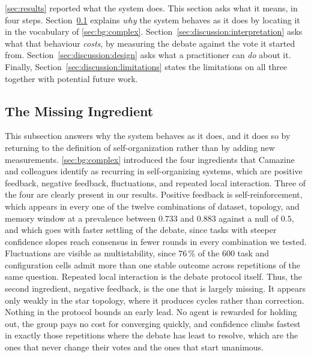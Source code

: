 \autoref{sec:results} reported what the system does. This section asks what it
means, in four steps. Section~\ref{sec:results:synthesis} explains \emph{why} the
system behaves as it does by locating it in the vocabulary of
\autoref{sec:bg:complex}. Section~\ref{sec:discussion:interpretation} asks what
that behaviour \emph{costs}, by measuring the debate against the vote it started
from. Section~\ref{sec:discussion:design} asks what a practitioner can
\emph{do} about it. Finally, Section~\ref{sec:discussion:limitations} states the limitations on
all three together with potential future work.

\subsection{The Missing Ingredient}
\label{sec:results:synthesis}

This subsection answers why the system behaves as it does, and it does so by
returning to the definition of self-organization rather than by adding new
measurements. \autoref{sec:bg:complex} introduced the four ingredients that Camazine and
colleagues identify as recurring in self-organizing systems, which are positive
feedback, negative feedback, fluctuations, and repeated local interaction. Three
of the four are clearly present in our results. Positive feedback is self-reinforcement,
which appears in every one of the twelve combinations of dataset, topology, and
memory window at a prevalence between $0.733$ and $0.883$ against a null of
$0.5$, and which goes with faster settling of the debate, since tasks with
steeper confidence slopes reach consensus in fewer rounds in every combination we
tested. Fluctuations are visible as multistability, since $76\,\%$ of the $600$
task and configuration cells admit more than one stable outcome across
repetitions of the same question. Repeated local interaction is the debate
protocol itself. Thus, the second ingredient, negative feedback, is the one that is largely missing.
It appears only weakly in the star topology, where it produces cycles rather than
correction.
Nothing in the protocol bounds an early lead. No agent is rewarded for holding out, the group
pays no cost for converging quickly, and confidence climbs fastest in exactly
those repetitions where the debate has least to resolve, which are the ones that
never change their votes and the ones that start unanimous.

